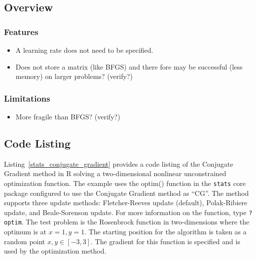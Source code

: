 
\subsection{Overview}

\subsubsection{Features}

\begin{itemize}
	\item A learning rate does not need to be specified.
	\item Does not store a matrix (like BFGS) and there fore may be successful (less memory) on larger problems? (verify?)
\end{itemize}

\subsubsection{Limitations}

\begin{itemize}
	\item More fragile than BFGS? (verify?)
\end{itemize}

\subsection{Code Listing}
Listing~\ref{stats_conjugate_gradient} provides a code listing of the Conjugate Gradient method in R solving a two-dimensional nonlinear unconstrained optimization function.
The example uses the {optim()} function in the \texttt{stats} core package configured to use the Conjugate Gradient method as ``CG''. The method supports three update methods: Fletcher-Reeves update (default), Polak-Ribiere update, and Beale-Sorenson update. For more information on the function, type \texttt{?optim}.
The test problem is the Rosenbrock function in two-dimensions where the optimum is at $x=1, y=1$. The starting position for the algorithm is taken as a random point $x,y \in [-3,3]$.  The gradient for this function is specified and is used by the optimization method.


